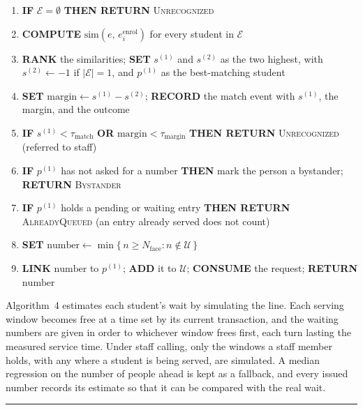 \documentclass{research}
\newenvironment{algsteps}
  {\setlength{\topsep}{2pt}\begin{enumerate}%
   \setlength{\itemsep}{0pt}\setlength{\parsep}{0pt}}
  {\end{enumerate}}
\begin{document}
\begin{algsteps}
  \item \textbf{IF} $\mathcal{E} = \emptyset$ \textbf{THEN RETURN}
        \textsc{Unrecognized}
  \item \textbf{COMPUTE} $\mathrm{sim}(e,\, e_i^{\mathrm{enrol}})$ for
        every student in $\mathcal{E}$
  \item \textbf{RANK} the similarities; \textbf{SET} $s^{(1)}$ and
        $s^{(2)}$ as the two highest, with $s^{(2)} \gets -1$ if
        $|\mathcal{E}| = 1$, and $p^{(1)}$ as the best-matching student
  \item \textbf{SET} $\mathrm{margin} \gets s^{(1)} - s^{(2)}$;
        \textbf{RECORD} the match event with $s^{(1)}$, the margin, and
        the outcome
  \item \textbf{IF} $s^{(1)} < \tau_{\mathrm{match}}$ \textbf{OR}
        $\mathrm{margin} < \tau_{\mathrm{margin}}$ \textbf{THEN RETURN}
        \textsc{Unrecognized} (referred to staff)
  \item \textbf{IF} $p^{(1)}$ has not asked for a number \textbf{THEN}
        mark the person a bystander; \textbf{RETURN} \textsc{Bystander}
  \item \textbf{IF} $p^{(1)}$ holds a pending or waiting entry
        \textbf{THEN RETURN} \textsc{AlreadyQueued} (an entry already
        served does not count)
  \item \textbf{SET} $\mathrm{number} \gets
        \min\{\, n \geq N_{\mathrm{face}} : n \notin \mathcal{U} \,\}$
  \item \textbf{LINK} $\mathrm{number}$ to $p^{(1)}$; \textbf{ADD} it to
        $\mathcal{U}$; \textbf{CONSUME} the request; \textbf{RETURN}
        $\mathrm{number}$
\end{algsteps}
\vspace{0.3em}

Algorithm~4 estimates each student's wait by simulating the line. Each
serving window becomes free at a time set by its current transaction,
and the waiting numbers are given in order to whichever window frees
first, each turn lasting the measured service time. Under staff calling,
only the windows a staff member holds, with any where a student is being
served, are simulated. A median regression on the number of people ahead
is kept as a fallback, and every issued number records its estimate so
that it can be compared with the real wait.

\vspace{0.5em}
\noindent\rule{\linewidth}{0.8pt}
\end{document}
